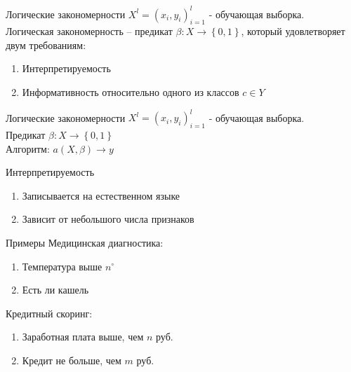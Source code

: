 \documentclass[10pt]{beamer}
\begin{document}
\begin{frame}{Логические закономерности}
	${X^l = \left( x_i, y_i \right)_{i=1}^l}$ - обучающая выборка.\\
	\bigbreak
	\alert{Логическая закономерность} -- предикат ${\beta: X \rightarrow \left\{ 0, 1 \right\} }$, который удовлетворяет двум требованиям:\\
	\pause
	\begin{enumerate} 
		\item Интерпретируемость
		\pause
		\item Информативность относительно одного из классов ${c \in Y}$
	\end{enumerate}
\end{frame}

\begin{frame}{Логические закономерности}
	${X^l = \left( x_i, y_i \right)_{i=1}^l}$ - обучающая выборка.\\
	\bigbreak
  Предикат ${\beta: X \rightarrow \left\{ 0, 1 \right\} }$\\
	\bigbreak
	\alert{Алгоритм}: $a(X, \beta) \rightarrow y$
\end{frame}

\begin{frame}{Интерпретируемость}
	\begin{enumerate}
		\item Записывается на естественном языке
		\item Зависит от небольшого числа признаков
	\end{enumerate}
\end{frame}

\begin{frame}{Примеры}
	Медицинская диагностика:	
		\begin{enumerate} [-]
			\item Температура выше $n^\circ$
			\item Есть ли кашель
		\end{enumerate}
	\bigbreak
	Кредитный скоринг:	
		\begin{enumerate} [-]
			\item Заработная плата выше, чем $n$ руб.
			\item Кредит не больше, чем $m$ руб.
		\end{enumerate}
\end{frame}
\end{document}
